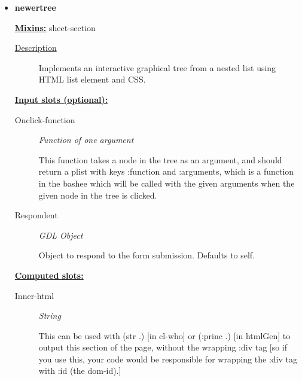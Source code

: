 \documentclass [11pt]{book}
\begin{document}
\begin{itemize}

\item {}
\label{prim:newertree}
\textbf{newertree}


\textbf{
\underline{Mixins:}} sheet-section





\begin{description}

\item [
\underline{Description}]


Implements an interactive graphical tree from a nested list using HTML list element and CSS.



\end{description}








\textbf{
\underline{Input slots (optional):}}

\begin{description}

\item [Onclick-function]
\emph{Function of one argument}

 This function takes a node in the tree as an argument, and should return
a plist with keys :function and :arguments, which is a function in the bashee which will be called
with the given arguments when the given node in the tree is clicked.




\item [Respondent]
\emph{GDL Object}

 Object to respond to the form submission. Defaults to self.




\end{description}






\textbf{
\underline{Computed slots:}}

\begin{description}

\item [Inner-html]
\emph{String}

 This can be used with (str .) [in cl-who] or (:princ .) [in htmlGen]
to output this section of the page, without the wrapping :div tag [so if you use this,
your code would be responsible for wrapping the :div tag with :id (the dom-id).]





\end{description}
\end{itemize}
\end{document}
